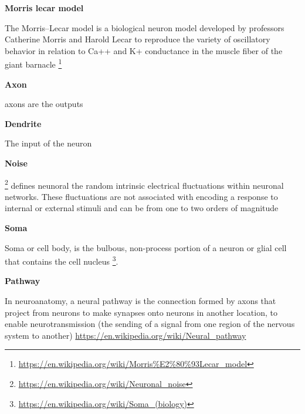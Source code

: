 \documentclass{book}
\providecommand{\ProjectDeepHeading}[2]{%
    \par\medskip\noindent\textbf{#2}\par\smallskip
}
\providecommand{\seeherefooter}[1]{\footnote{\url{#1}}}
\providecommand{\clickurlfooter}[1]{\footnote{\url{#1}}}
\begin{document}
\ProjectDeepHeading{8}{Morris lecar model}


The Morris–Lecar model is a biological neuron model developed by professors Catherine Morris and Harold Lecar to reproduce the variety of oscillatory behavior in relation to Ca++ and K+ conductance in the muscle fiber of the giant barnacle \seeherefooter{https://en.wikipedia.org/wiki/Morris\%E2\%80\%93Lecar_model}

\ProjectDeepHeading{5}{Axon}


axons are the outputs

\ProjectDeepHeading{5}{Dendrite}


The input of the neuron

\ProjectDeepHeading{5}{Noise}


\clickurlfooter{https://en.wikipedia.org/wiki/Neuronal_noise} defines neunoral the random intrinsic electrical fluctuations within neuronal networks. These fluctuations are not associated with encoding a response to internal or external stimuli and can be from one to two orders of magnitude

\ProjectDeepHeading{5}{Soma}


Soma or cell body, is the bulbous, non-process portion of a neuron or glial cell that contains the cell nucleus \seeherefooter{https://en.wikipedia.org/wiki/Soma_(biology)}.

\ProjectDeepHeading{4}{Pathway}


In neuroanatomy, a neural pathway is the connection formed by axons that project from neurons to make synapses onto neurons in another location, to enable neurotransmission (the sending of a signal from one region of the nervous system to another)   \url{https://en.wikipedia.org/wiki/Neural_pathway}
\end{document}
